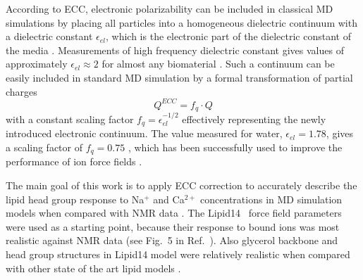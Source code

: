 \documentclass[aip,jcp,twocolumn]{revtex4}
\begin{document}
According to ECC, electronic
polarizability can be included in classical MD simulations by
placing all particles into a homogeneous dielectric continuum 
with a dielectric constant $\epsilon _{el}$, 
which is the electronic part of the dielectric constant of 
the media \cite{leontyev11}. Measurements of high frequency 
dielectric constant gives values of approximately $\epsilon _{el} \approx 2$ 
for almost any biomaterial \cite{some_original_work, leontyev11}.
Such a continuum can be easily included in standard MD simulation by
a formal transformation of partial charges 
\begin{equation}
  Q^{ECC} = f_q \cdot Q
\end{equation}
with a constant scaling factor $f_q = \epsilon _{el} ^{-1/2}$ 
effectively representing the newly introduced electronic continuum. 
The value measured for water, $\epsilon _{el} = 1.78$, gives 
a scaling factor of $f_q = 0.75$ \cite{some_orig_source, leontyev11}, which has been
successfully used to improve the performance of ion force fields \cite{kohagen14,kohagen16,??}. 

The main goal of this work is to apply ECC correction to accurately 
describe the lipid head group response to Na$^+$ and Ca$^{2+}$ concentrations
in MD simulation models when compared with NMR data \cite{catte16}. 
The Lipid14~\cite{dickson14} force field parameters were used as a starting point,
because their response to bound ions was most realistic against NMR data
(see Fig.~5 in Ref.~).
Also glycerol backbone and head group structures in Lipid14 model were
relatively realistic when compared with other state of the art lipid models \cite{botan15}.
\end{document}
